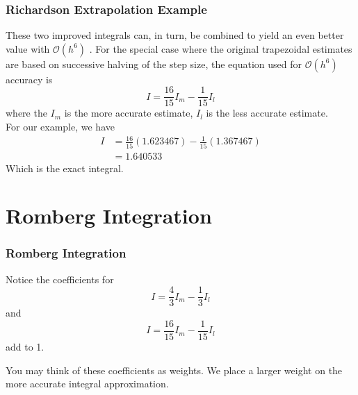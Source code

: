 \documentclass{if-beamer}
\begin{document}
\begin{frame}[t]
	\frametitle{Richardson Extrapolation Example}
	 These two improved integrals can, in turn, be combined to yield an
	even better value with $\mathcal{O}(h^6)$ . For the special case where the original trapezoidal estimates
	are based on successive halving of the step size, the equation used for $\mathcal{O}(h^6)$ accuracy is
	$$ I = \frac{16}{15}I_m -\frac{1}{15}I_l$$
	where the $I_m$ is the more accurate estimate, $I_l$ is the less accurate estimate. \\\vspace{10pt} For our example, we have
	\begin{align*}
		I & = \frac{16}{15}(1.623467) -\frac{1}{15}(1.367467)\\
		& = 1.640533
	\end{align*}	
Which is the exact integral.
\end{frame}

\section{Romberg Integration}

\begin{frame}[t]
	\frametitle{Romberg Integration}
	Notice the coefficients for
	$$ I = \frac{4}{3}I_m -\frac{1}{3}I_l$$
	and
	$$ I = \frac{16}{15}I_m -\frac{1}{15}I_l$$
	add to 1. \\\vspace{10pt}
	
	You may think of these coefficients as weights. We place a larger weight on the more accurate integral approximation. \\\vspace{10pt}
	
\end{frame}
\end{document}

